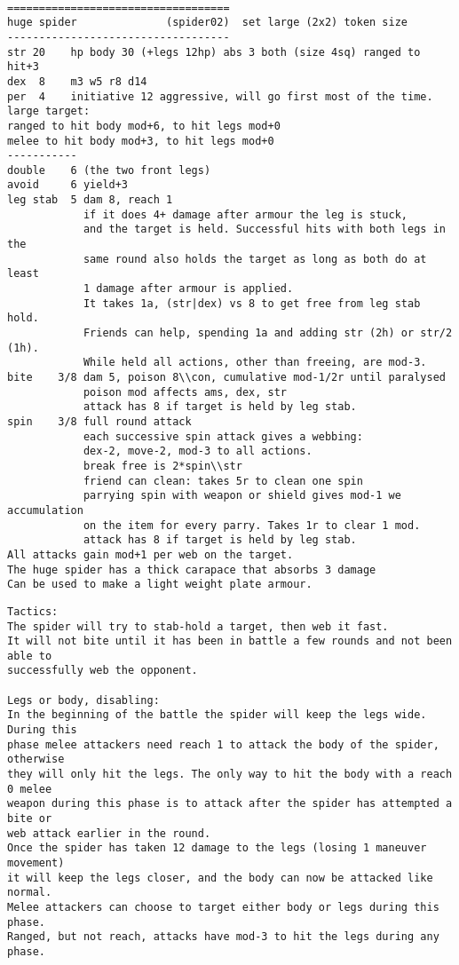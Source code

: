 \

\pagebreak[1]
\tiny \begin{samepage} \begin{verbatim}
===================================
huge spider              (spider02)  set large (2x2) token size
-----------------------------------
str 20    hp body 30 (+legs 12hp) abs 3 both (size 4sq) ranged to hit+3
dex  8    m3 w5 r8 d14
per  4    initiative 12 aggressive, will go first most of the time.
large target:
ranged to hit body mod+6, to hit legs mod+0
melee to hit body mod+3, to hit legs mod+0
-----------
double    6 (the two front legs)
avoid     6 yield+3
leg stab  5 dam 8, reach 1
            if it does 4+ damage after armour the leg is stuck,
            and the target is held. Successful hits with both legs in the
            same round also holds the target as long as both do at least
            1 damage after armour is applied.
            It takes 1a, (str|dex) vs 8 to get free from leg stab hold.
            Friends can help, spending 1a and adding str (2h) or str/2 (1h).
            While held all actions, other than freeing, are mod-3.
bite    3/8 dam 5, poison 8\\con, cumulative mod-1/2r until paralysed
            poison mod affects ams, dex, str
            attack has 8 if target is held by leg stab.
spin    3/8 full round attack
            each successive spin attack gives a webbing:
            dex-2, move-2, mod-3 to all actions.
            break free is 2*spin\\str
            friend can clean: takes 5r to clean one spin
            parrying spin with weapon or shield gives mod-1 we accumulation
            on the item for every parry. Takes 1r to clear 1 mod.
            attack has 8 if target is held by leg stab.
All attacks gain mod+1 per web on the target.
The huge spider has a thick carapace that absorbs 3 damage
Can be used to make a light weight plate armour.

\end{verbatim} \end{samepage} \begin{samepage} \begin{verbatim}
Tactics:
The spider will try to stab-hold a target, then web it fast.
It will not bite until it has been in battle a few rounds and not been able to
successfully web the opponent.

Legs or body, disabling:
In the beginning of the battle the spider will keep the legs wide. During this
phase melee attackers need reach 1 to attack the body of the spider, otherwise
they will only hit the legs. The only way to hit the body with a reach 0 melee
weapon during this phase is to attack after the spider has attempted a bite or
web attack earlier in the round.
Once the spider has taken 12 damage to the legs (losing 1 maneuver movement)
it will keep the legs closer, and the body can now be attacked like normal.
Melee attackers can choose to target either body or legs during this phase.
Ranged, but not reach, attacks have mod-3 to hit the legs during any phase.


\end{verbatim}
\end{samepage}
